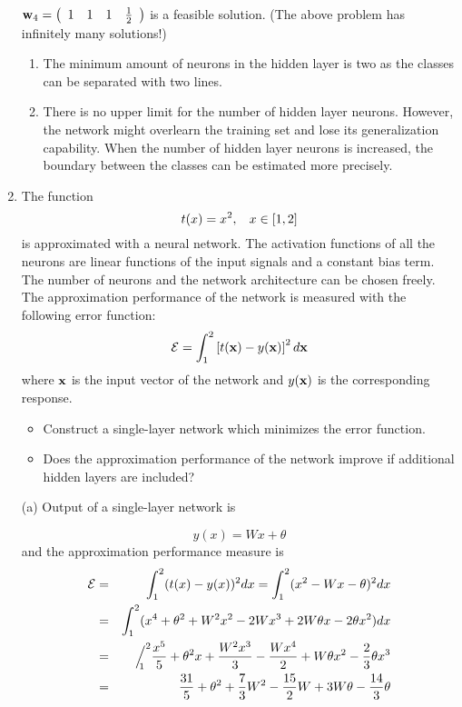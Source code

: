 \begin{enumerate}
\begin{solution}
    ${\bf{w}}_4=\left(\begin{array}{cccc}1&1&1&\frac{1}{2}\end{array}\right)$ is a feasible solution. (The above problem has infinitely many solutions!)
    \begin{enumerate}
    \item[(a)] The minimum amount of neurons in the hidden layer is two as the classes can be separated with two lines.
    \item[(b)] There is no upper limit for the number of hidden layer
      neurons. However, the network might overlearn the training set and
      lose its generalization capability. When the number of hidden layer
      neurons is increased, the boundary between the classes can be
      estimated more precisely.
    \end{enumerate}


  \end{solution}
  
\item The function
  \[
  t(x) = x^2, \hspace{3mm} x \in \left[ 1, 2 \right]
  \]
  is approximated with a neural network. The activation functions of all
  the neurons are linear functions of the input signals and a constant
  bias term. The number of neurons and the network architecture can be
  chosen freely. The approximation performance of the network is
  measured with the following error function:
  \[
  \mathcal{E} = \int_{1}^2 \left[ t({\bf x})-y({\bf x}) \right]^2 d{\bf x}
  \]
  where ${\bf{x}}$ is the input vector of the network and $y({\bf{x}})$ is the
  corresponding response.
  \begin{itemize}
  \item[(a)] Construct a single-layer network which minimizes the error function.
  \item[(b)] Does the approximation performance of the network improve if
    additional hidden layers are included?
  \end{itemize}

  \begin{solution}

    (a) Output of a single-layer network is

    \begin{equation*}
      y(x)=Wx+\theta
    \end{equation*}
    and the approximation performance measure is
    \begin{eqnarray*}
      \mathcal{E}&=&\int_1^2(t(x)-y(x))^2 dx = \int_1^2
      (x^2-Wx-\theta)^2dx\\
      &=&\int_1^2 (x^4+\theta^2 +W^2x^2-2Wx^3+2W\theta x-2\theta x^2)dx\\
      &=&\Big/^2_{\mspace{-11.0mu} 1} \frac{x^5}{5}
      +\theta^2x+\frac{W^2x^3}{3}-\frac{Wx^4}{2}+W\theta x^2-\frac{2}{3}\theta x^3\\
      &=&\frac{31}{5}+\theta^2 +\frac{7}{3}W^2-\frac{15}{2}W+3W\theta-\frac{14}{3}\theta
    \end{eqnarray*}


\end{solution}
\end{enumerate}
